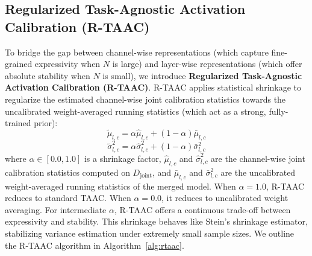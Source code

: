 \documentclass{article}
\theoremstyle{plain}
\theoremstyle{definition}
\theoremstyle{remark}
\begin{document}
\subsection{Regularized Task-Agnostic Activation Calibration (R-TAAC)}
To bridge the gap between channel-wise representations (which capture fine-grained expressivity when $N$ is large) and layer-wise representations (which offer absolute stability when $N$ is small), we introduce \textbf{Regularized Task-Agnostic Activation Calibration (R-TAAC)}.
R-TAAC applies statistical shrinkage to regularize the estimated channel-wise joint calibration statistics towards the uncalibrated weight-averaged running statistics (which act as a strong, fully-trained prior):
\begin{equation}
\tilde{\mu}_{l, c} = \alpha \hat{\mu}_{l, c} + (1 - \alpha) \bar{\mu}_{l, c}
\end{equation}
\begin{equation}
\tilde{\sigma}_{l, c}^2 = \alpha \hat{\sigma}_{l, c}^2 + (1 - \alpha) \bar{\sigma}_{l, c}^2
\end{equation}
where $\alpha \in [0.0, 1.0]$ is a shrinkage factor, $\hat{\mu}_{l, c}$ and $\hat{\sigma}_{l, c}^2$ are the channel-wise joint calibration statistics computed on $D_{\text{joint}}$, and $\bar{\mu}_{l, c}$ and $\bar{\sigma}_{l, c}^2$ are the uncalibrated weight-averaged running statistics of the merged model.
When $\alpha = 1.0$, R-TAAC reduces to standard TAAC. When $\alpha = 0.0$, it reduces to uncalibrated weight averaging. For intermediate $\alpha$, R-TAAC offers a continuous trade-off between expressivity and stability. This shrinkage behaves like Stein's shrinkage estimator, stabilizing variance estimation under extremely small sample sizes. We outline the R-TAAC algorithm in Algorithm~\ref{alg:rtaac}.
\end{document}
